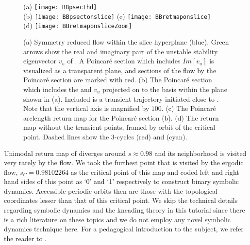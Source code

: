{\begin{figure}
\centering
  (a) \texttt{[image: BBpsecthd]} \\
  (b) \texttt{[image: BBpsectonslice]}
  (c) \texttt{[image: BBretmaponslice]} \\
  (d) \texttt{[image: BBretmaponsliceZoom]}
\caption{(a) Symmetry reduced flow within the slice hyperplane (blue).
			Green arrows show the real and imaginary part of the unstable stability
			eigenvector $v_u$ of \REQV{}{}. A Poincar\'e section which includes
			$Im[v_u]$ is visualized as a transparent plane, and sections
			of the flow by the Poincar\'e section are marked with red.
		 (b) The Poincar\'e section which includes the \REQV{}{} and $v_u$ projected
			on to the basis within the plane shown in (a). Included is a
            transient trajectory initiated close to \REQV{}{}. Note that
		  	the vertical axis is magnified by $100$.
		 (c) The Poincar\'e arclength return map for the
		    Poincar\'e section (b).
		 (d) The return map without the transient points, framed by
            orbit of the critical point.
		 	Dashed lines show the 3-cycles  (red) and  (cyan).}
\label{fig:psectandretmap}
\end{figure}

Unimodal return map of  diverges around 
$s \approx 0.98$ and its neighborhood is visited very rarely by the flow. We 
took the furthest point that is visited by the ergodic flow, $s_C=0.98102264$ 
as the critical point of this map and coded left and right hand sides of this
point as `0' and `1' respectively to construct binary symbolic dynamics. 
Accessible periodic orbits then are those with the topological coordinates 
lesser than that of this critical point. We skip the technical details 
regarding symbolic dynamics and the kneading theory in this tutorial since 
there is a rich literature on these topics and we do not employ any novel 
symbolic dynamics technique here. For a pedagogical introduction to the 
subject, we refer the reader to . 

}
